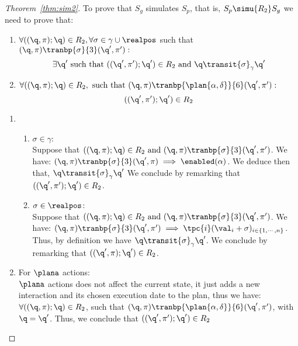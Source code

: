 \begin{proof}[Theorem~\ref{thm:sim2}]
\label{proof:sim2}
To prove that $S_g$ simulates 
$S_p$, that is, $S_p\simu{R_2}S_g$ we need to prove that:\\
\begin{enumerate}
  \item $\forall ((\q,\pi);\q)\in R_2,\forall \sigma\in\gamma\cup\realpos$ such that 
    $(\q,\pi)\tranbp{\sigma}{3}(\q',\pi'):$
\begin{displaymath}
  \exists\q'\text{ such that }
  ((\q',\pi');\q')\in R_2\text{ and }\q\transit{\sigma}_{\gamma}\q'
\end{displaymath}
  \item $\forall ((\q,\pi);\q)\in R_2,\text{ such that }
    (\q,\pi)\tranbp{\plan{\alpha,\delta}}{6}(\q',\pi'):$\\
\begin{displaymath}
        ((\q',\pi');\q')\in R_2
\end{displaymath}
\end{enumerate}
\begin{enumerate}
  \item 
\begin{enumerate}[label=(\roman*)]
\item $\sigma\in\gamma$:\\
  Suppose that $((\q,\pi);\q)\in R_2 \text{ and } (\q,\pi)\tranbp{\sigma}{3}(\q',\pi')$.
  We have: $(\q,\pi)\tranbp{\sigma}{3}(\q',\pi)\implies\enabled(\alpha)$. We deduce then that,
$\q\transit{\sigma}_{\gamma}\q'$  
We conclude by remarking that $((\q',\pi');\q')\in R_2$.

\item $\sigma\in\realpos$:\\
  Suppose that $((\q,\pi);\q)\in R_2 \text{ and } (\q,\pi)\tranbp{\sigma}{3}(\q',\pi')$.
  We have:
      $(\q,\pi)\tranbp{\sigma}{3}(\q',\pi')\implies\tpc{i}(\val_i+\sigma)_{i\in\{1,\cdots,n
      \}}$. Thus, by definition we have $\q\transit{\sigma}_{\gamma}\q'$.
      We conclude by remarking that $((\q',\pi);\q')\in R_2$.
\end{enumerate}
  \item For $\plana$ actions:\\
    $\plana$ actions does not affect the current state, it just adds a new interaction and its chosen execution date to the plan, thus we have:
   $\forall ((\q,\pi);\q)\in R_2$, such that 
    $(\q,\pi)\tranbp{\plan{\alpha,\delta}}{6}(\q',\pi')$, with $\q=\q'$. Thus, we conclude that $((\q',\pi');\q')\in R_2$
\end{enumerate}
\end{proof}


